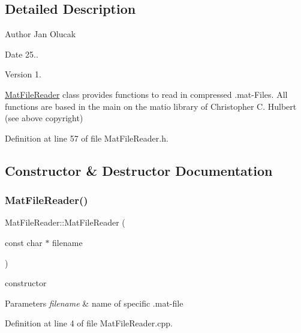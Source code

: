 \subsection{Detailed Description}
\begin{DoxyAuthor}{Author}
Jan Olucak 
\end{DoxyAuthor}
\begin{DoxyDate}{Date}
25.. 
\end{DoxyDate}
\begin{DoxyVersion}{Version}
1.
\end{DoxyVersion}
\hyperlink{class_mat_file_reader}{Mat\+File\+Reader} class provides functions to read in compressed .mat-\/\+Files. All functions are based in the main on the matio library of Christopher C. Hulbert (see above copyright) 

Definition at line 57 of file Mat\+File\+Reader.\+h.



\subsection{Constructor \& Destructor Documentation}
\mbox{\label{class_mat_file_reader_aad136aff8215618eff5e3390b374e61a}} 
\subsubsection{\texorpdfstring{Mat\+File\+Reader()}{MatFileReader()}}
{\footnotesize\ttfamily Mat\+File\+Reader\+::\+Mat\+File\+Reader (\begin{DoxyParamCaption}\item[{const char $\ast$}]{filename }\end{DoxyParamCaption})}



constructor 


\begin{DoxyParams}{Parameters}
{\em filename} & name of specific .mat-\/file \\
\hline
\end{DoxyParams}


Definition at line 4 of file Mat\+File\+Reader.\+cpp.

\mbox{\label{class_mat_file_reader_a823b7d4b2d83c79d92a7936fe0db39c7}} 
